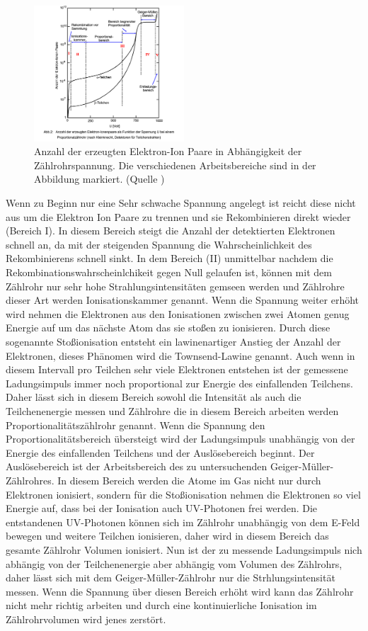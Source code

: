 \begin{figure}
    \centering
    \includegraphics[width=0.5\textwidth]{bilder/Anzahl_der_Elektronen.png}
    \caption{ Anzahl der erzeugten Elektron-Ion Paare in Abhängigkeit der Zählrohrspannung. Die verschiedenen Arbeitsbereiche sind in der Abbildung markiert. (Quelle \cite{Anleitung})}
    \label{fig:Anzahl_der_Elektronen}
\end{figure}
Wenn zu Beginn nur eine Sehr schwache Spannung angelegt ist reicht diese nicht aus um die Elektron Ion Paare zu trennen und sie Rekombinieren direkt wieder (Bereich I).
In diesem Bereich steigt die Anzahl der detektierten Elektronen schnell an, da mit der steigenden Spannung die Wahrscheinlichkeit des Rekombinierens schnell sinkt.
In dem Bereich (II) unmittelbar nachdem die Rekombinationswahrscheinlchikeit gegen Null gelaufen ist, können mit dem Zählrohr nur sehr hohe Strahlungsintensitäten gemseen werden und Zählrohre dieser Art werden Ionisationskammer genannt.
Wenn die Spannung weiter erhöht wird nehmen die Elektronen aus den Ionisationen zwischen zwei Atomen genug Energie auf um das nächste Atom das sie stoßen zu ionisieren.
Durch diese sogenannte Stoßionisation entsteht ein lawinenartiger Anstieg der Anzahl der Elektronen, dieses Phänomen wird die Townsend-Lawine genannt.
Auch wenn in diesem Intervall pro Teilchen sehr viele Elektronen entstehen ist der gemessene Ladungsimpuls immer noch proportional zur Energie des einfallenden Teilchens.
Daher lässt sich in diesem Bereich sowohl die Intensität als auch die Teilchenenergie messen und Zählrohre die in diesem Bereich arbeiten werden Proportionalitätszählrohr genannt.
Wenn die Spannung den Proportionalitätsbereich übersteigt wird der Ladungsimpuls unabhängig von der Energie des einfallenden Teilchens und der Auslösebereich beginnt.
Der Auslösebereich ist der Arbeitsbereich des zu untersuchenden Geiger-Müller-Zählrohres.
In diesem Bereich werden die Atome im Gas nicht nur durch Elektronen ionisiert, sondern für die Stoßionisation nehmen die Elektronen so viel Energie auf, dass bei der Ionisation auch UV-Photonen frei werden.
Die entstandenen UV-Photonen  können sich im Zählrohr unabhängig von dem E-Feld bewegen und weitere Teilchen ionisieren, daher wird in diesem Bereich das gesamte Zählrohr Volumen ionisiert.
Nun ist der zu messende Ladungsimpuls nich abhängig von der Teilchenenergie aber abhängig vom Volumen des Zählrohrs, daher lässt sich mit dem Geiger-Müller-Zählrohr nur die Strhlungsintensität messen.
Wenn die Spannung über diesen Bereich erhöht wird kann das Zählrohr nicht mehr richtig arbeiten und durch eine kontinuierliche Ionisation im Zählrohrvolumen wird jenes zerstört.
